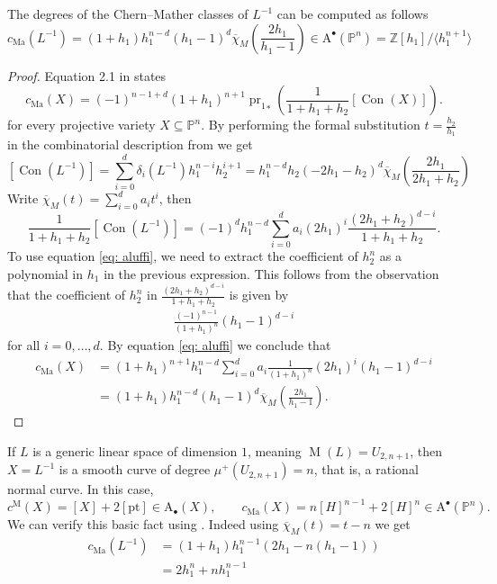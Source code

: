 \documentclass[12pt,a4paper,english]{scrartcl}
\newcommand{\ZZ}{\mathbb{Z}}
\newcommand{\PP}{\mathbb{P}}
\DeclareMathOperator{\Matroid}{M}
\DeclareMathOperator{\Con}{Con}
\newcommand{\ChowGrp}{\mathrm{A}}
\begin{document}
\begin{theorem}\label{thm:ChernMather}
The degrees of the Chern--Mather classes of $L^{-1}$ can be computed as follows
\[
c_{\mathrm{Ma}}(L^{-1}) = (1+h_1)h_1^{n-d}(h_1-1)^d\overline{\chi}_M\left(\frac{2h_1}{h_1-1}\right)\in  \ChowGrp^\bullet(\PP^n) = \ZZ[h_1]/\langle h_1^{n+1}\rangle
\]
\end{theorem}
\begin{proof}
Equation 2.1 in \cite{Aluffi2017} states
\begin{equation}\label{eq: aluffi}
c_{\mathrm{Ma}}(X) = (-1)^{n-1+d}(1+h_1)^{n+1}  {\operatorname{pr}_1}_*\left(\frac{1}{1+h_1+h_2}  [\Con(X)]\right).
\end{equation}
for every projective variety $X\subseteq \PP^n$.
By performing the formal substitution $t = \frac{h_2}{h_1}$ in the combinatorial description from  we get
\[
[\Con(L^{-1})]=\sum_{i=0}^d\delta_i(L^{-1})h_1^{n-i}h_2^{i+1}=h_1^{n-d}h_2(-2h_1-h_2)^d\overline{\chi}_M\left(\frac{2h_1}{2h_1+h_2}\right)
\]
Write $\overline{\chi}_M(t)=\sum_{i=0}^da_it^i$, then
\[
\frac{1}{1+h_1+h_2}[\Con(L^{-1})]=(-1)^dh_1^{n-d}\sum_{i=0}^da_i(2h_1)^i\frac{(2h_1+h_2)^{d-i}}{1+h_1+h_2}.
\]
To use equation \eqref{eq: aluffi}, we need to extract the coefficient of $h_2^n$ as a polynomial in $h_1$ in the previous expression. This follows from the observation that the coefficient of $h_2^n$ in $\frac{(2h_1+h_2)^{d-i}}{1+h_1+h_2}$ is given by 
\begin{align*}
    \frac{(-1)^{n-1}}{(1+h_1)^n}(h_1-1)^{d-i}
\end{align*}
for all $i=0,\dots,d$. By equation \eqref{eq: aluffi} we conclude that \begin{align*}
    c_{\mathrm{Ma}}(X) &= (1+h_1)^{n+1} h_1^{n-d}\sum_{i=0}^da_i\frac{1}{(1+h_1)^n}(2h_1)^i(h_1-1)^{d-i} \\
    &=(1+h_1)h_1^{n-d}(h_1-1)^d\overline{\chi}_M\left(\frac{2h_1}{h_1-1}\right).
\end{align*}
\end{proof}

\begin{example}
If $L$ is a generic linear space of dimension $1$, meaning $\Matroid(L) = U_{2,n+1}$, then $X = L^{-1}$ is a smooth curve of degree $\mu^+(U_{2,n+1}) = n$, that is, a rational normal curve. In this case,
\[
c^{\mathrm{M}}(X) = [X] + 2[\text{pt}] \in \ChowGrp_\bullet(X), \qquad c_{\mathrm{Ma}}(X) = n[H]^{n-1} +2[H]^n \in \ChowGrp^\bullet(\PP^n).
\]
We can verify this basic fact using . Indeed using $\overline{\chi}_M(t)=t-n$ we get \begin{align*}
    c_{\mathrm{Ma}}(L^{-1}) &=(1+h_1)h_1^{n-1}(2h_1-n(h_1-1)) \\
    &=2h_1^n+nh_1^{n-1}
\end{align*}

\end{example}
\end{document}
